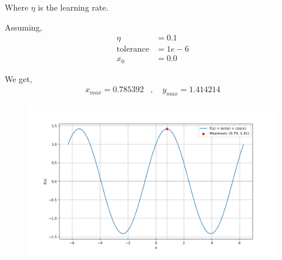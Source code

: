 \documentclass[journal]{IEEEtran}
\begin{document}
Where $\eta$ is the learning rate.

Assuming,
\begin{align}
    \eta &= 0.1 \\
    \text{tolerance} &= 1e-6 \\
    x_{0} &= 0.0
\end{align}

We get,
\begin{align}
    x_{max} = 0.785392&,\quad y_{max} = 1.414214
\end{align}

\begin{figure}[h]
    \centering
    \includegraphics[width=\columnwidth]{figs/Figure_1.png}
    \label{fig:Plot}
    \end{figure}
\end{document}
